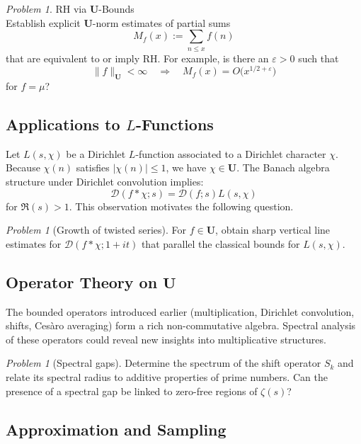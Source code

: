 \documentclass[11pt,a4paper]{article}
\theoremstyle{plain}
\theoremstyle{definition}
\theoremstyle{remark}
\newtheorem{problem}[theorem]{Problem}
\begin{document}
\begin{problem}RH via $\mathbf{U}$-Bounds\\
	Establish explicit $\mathbf{U}$-norm estimates of partial sums
	\[
	M_f(x) := \sum_{n\le x} f(n)
	\]
	that are equivalent to or imply RH.
	For example, is there an $\varepsilon>0$ such that
	\[
	\|f\|_{\mathbf{U}}<\infty
	\quad\Rightarrow\quad
	M_f(x)=O\bigl(x^{1/2+\varepsilon}\bigr)
	\]
	for $f=\mu$?
\end{problem}

\subsection{Applications to $L$-Functions}

Let $L(s,\chi)$ be a Dirichlet $L$-function associated to a
Dirichlet character $\chi$.
Because $\chi(n)$ satisfies $|\chi(n)|\le1$,
we have $\chi\in \mathbf{U}$.
The Banach algebra structure under Dirichlet convolution implies:
\[
\mathcal{D}(f*\chi;s)
= \mathcal{D}(f;s)L(s,\chi)
\]
for $\Re(s)>1$.
This observation motivates the following question.

\begin{problem}[Growth of twisted series]
	For $f\in \mathbf{U}$, obtain sharp vertical line estimates
	for $\mathcal{D}(f*\chi;1+it)$ that parallel the
	classical bounds for $L(s,\chi)$.
\end{problem}

\subsection{Operator Theory on $\mathbf{U}$}

The bounded operators introduced earlier (multiplication,
Dirichlet convolution, shifts, Cesàro averaging)
form a rich non-commutative algebra.
Spectral analysis of these operators could reveal
new insights into multiplicative structures.

\begin{problem}[Spectral gaps]
	Determine the spectrum of the shift operator $S_k$
	and relate its spectral radius to additive properties
	of prime numbers.
	Can the presence of a spectral gap be linked
	to zero-free regions of $\zeta(s)$?
\end{problem}

\subsection{Approximation and Sampling}
\end{document}
